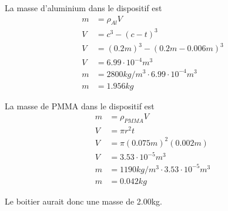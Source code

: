 La masse d'aluminium dans le dispositif est
\begin{align}
    m &= \rho_{Al} V\\
    V &= c^3 - (c-t)^3\\
    V &= (0.2m)^3 - (0.2m - 0.006m)^3\\
    V &= 6.99 \cdot 10^{-4} m^3\\
    m &= 2800 kg/m^3 \cdot 6.99 \cdot 10^{-4}m^3\\
    m &= 1.956 kg
\end{align}

La masse de PMMA dans le dispositif est
\begin{align}
    m &= \rho_{PMMA} V\\
    V &= \pi r^2 t\\
    V &= \pi (0.075m)^2 (0.002m)\\
    V &= 3.53 \cdot 10^{-5} m^3\\
    m &= 1190 kg/m^3 \cdot 3.53 \cdot 10^{-5} m^3\\
    m &= 0.042 kg
\end{align}

Le boitier aurait donc une masse de 2.00kg.
